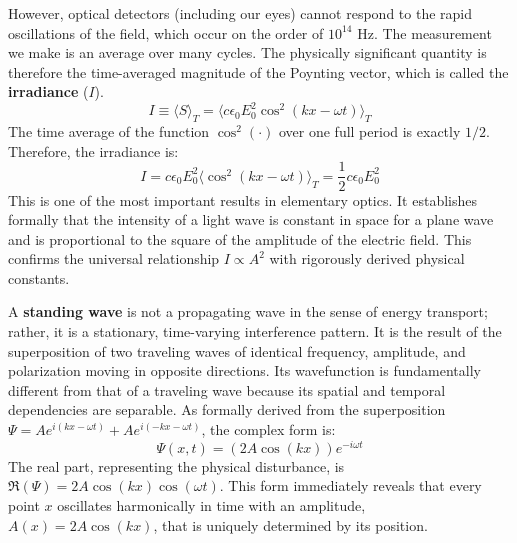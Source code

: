 \begin{proposition}
However, optical detectors (including our eyes) cannot respond to the rapid oscillations of the field, which occur on the order of $10^{14}$ Hz. The measurement we make is an average over many cycles. The physically significant quantity is therefore the time-averaged magnitude of the Poynting vector, which is called the \textbf{irradiance} ($I$).
$$ I \equiv \langle S \rangle_T = \langle c\epsilon_0 E_0^2 \cos^2(kx - \omega t) \rangle_T $$
The time average of the function $\cos^2(\cdot)$ over one full period is exactly $1/2$. Therefore, the irradiance is:
$$ I = c\epsilon_0 E_0^2 \langle \cos^2(kx - \omega t) \rangle_T = \frac{1}{2}c\epsilon_0 E_0^2 $$
This is one of the most important results in elementary optics. It establishes formally that the intensity of a light wave is constant in space for a plane wave and is proportional to the square of the amplitude of the electric field. This confirms the universal relationship $I \propto A^2$ with rigorously derived physical constants.
\end{proposition}

\begin{definition}
A \textbf{standing wave} is not a propagating wave in the sense of energy transport; rather, it is a stationary, time-varying interference pattern. It is the result of the superposition of two traveling waves of identical frequency, amplitude, and polarization moving in opposite directions. Its wavefunction is fundamentally different from that of a traveling wave because its spatial and temporal dependencies are separable. As formally derived from the superposition $\Psi = A e^{i(kx-\omega t)} + A e^{i(-kx-\omega t)}$, the complex form is:
$$ \Psi(x, t) = (2A\cos(kx))e^{-i\omega t} $$
The real part, representing the physical disturbance, is $\Re(\Psi) = 2A\cos(kx)\cos(\omega t)$. This form immediately reveals that every point $x$ oscillates harmonically in time with an amplitude, $A(x) = 2A\cos(kx)$, that is uniquely determined by its position.
\end{definition}


